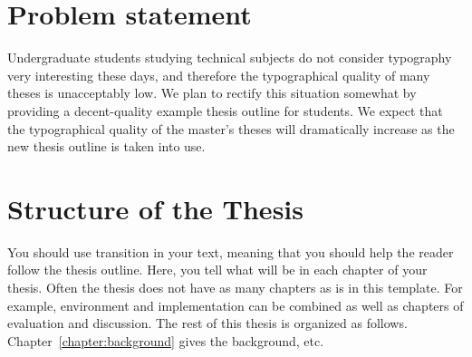 \section{Problem statement}

Undergraduate students studying technical subjects do not consider
typography very interesting these days, and therefore the
typographical quality of many theses is unacceptably low.  We plan to
rectify this situation somewhat by providing a decent-quality example
thesis outline for students.  We expect that the typographical quality
of the master's theses will dramatically increase as the new thesis
outline is taken into use.


\section{Structure of the Thesis}
\label{section:structure} 

You should use transition in your text, meaning that you should help
the reader follow the thesis outline. Here, you tell what will be in
each chapter of your thesis. Often the thesis does not have as many
chapters as is in this template. For example, environment and
implementation can be combined as well as chapters of evaluation and
discussion.  The rest of this thesis is organized as
follows. Chapter~\ref{chapter:background} gives the background, etc.

